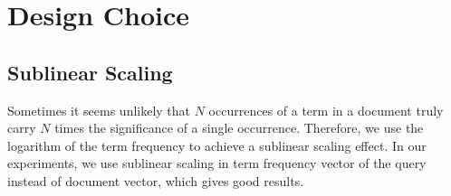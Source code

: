 
\usepackage{graphicx,amssymb,amsmath,enumerate}
\usepackage{courier}
\usepackage{color}
\usepackage{listings}
\usepackage{fancyvrb}
\usepackage{stmaryrd}

\oddsidemargin 0in
\evensidemargin 0in
\textwidth 6.5in
\topmargin -0.5in
\textheight 9.0in




\pagestyle{myheadings}  %

\section{Design Choice}

\subsection{Sublinear Scaling}
Sometimes it seems unlikely that $N$ occurrences of a term in a document truly carry $N$ times the significance of a single occurrence. Therefore, we use the logarithm of the term frequency to achieve a sublinear scaling effect.
In our experiments, we use sublinear scaling in term frequency vector of the query instead of document vector, which gives good results.

